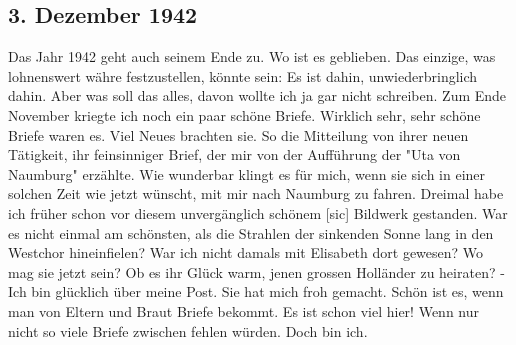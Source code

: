 \subsection{3. Dezember 1942}

Das Jahr 1942 geht auch seinem Ende zu.
Wo ist es geblieben.
Das einzige, was lohnenswert w\"{a}hre festzustellen, k\"{o}nnte sein: Es ist dahin, unwiederbringlich dahin.
Aber was soll das alles, davon wollte ich ja gar nicht schreiben.
Zum Ende November kriegte ich noch ein paar sch\"{o}ne Briefe.
Wirklich sehr, sehr sch\"{o}ne Briefe waren es.
Viel Neues brachten sie.
So die Mitteilung von ihrer neuen T\"{a}tigkeit, ihr feinsinniger Brief, der mir von der Auff\"{u}hrung der "Uta von Naumburg" erz\"{a}hlte.
Wie wunderbar klingt es f\"{u}r mich, wenn sie sich in einer solchen Zeit wie jetzt w\"{u}nscht, mit mir nach Naumburg zu fahren.
Dreimal habe ich fr\"{u}her schon vor diesem unverg\"{a}nglich sch\"{o}nem{\color{red} [sic] } Bildwerk gestanden.
War es nicht einmal am sch\"{o}nsten, als die Strahlen der sinkenden Sonne lang in den Westchor hineinfielen?
War ich nicht damals mit Elisabeth dort gewesen?
Wo mag sie jetzt sein?
Ob es ihr Gl\"{u}ck warm, jenen grossen Holl\"{a}nder zu heiraten?
- Ich bin gl\"{u}cklich \"{u}ber meine Post.
Sie hat mich froh gemacht.
Sch\"{o}n ist es, wenn man von Eltern und Braut Briefe bekommt.
Es ist schon viel hier!
Wenn nur nicht so viele Briefe zwischen fehlen w\"{u}rden.
Doch bin ich.

\clearpage
